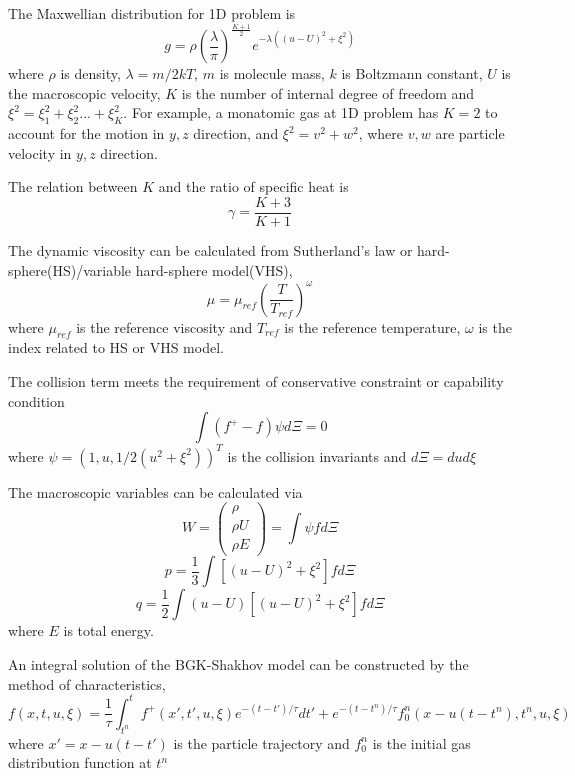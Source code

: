 \documentclass[a4paper]{book}
\begin{document}
The Maxwellian distribution for 1D problem is
\begin{equation}
    g = \rho\left(\frac{\lambda}{\pi}\right)^{\frac{K+1}{2}}e^{-\lambda((u-U)^2+\xi^2)}
\end{equation}
where $\rho$ is density, $\lambda=m/2kT$, $m$ is molecule mass, $k$ is Boltzmann constant, $U$ is the macroscopic velocity, $K$ is the number of internal degree of freedom and $\xi^2=\xi_1^2+\xi_2^2...+\xi_K^2$. For example, a monatomic gas at 1D problem has $K=2$ to account for the motion in $y,z$ direction, and $\xi^2=v^2+w^2$, where $v,w$ are particle velocity in $y,z$ direction. 

The relation between $K$ and the ratio of specific heat is
\begin{equation} 
    \gamma = \frac{K+3}{K+1}
\end{equation}

The dynamic viscosity can be calculated from Sutherland's law or hard-sphere(HS)/variable hard-sphere model(VHS),
\begin{equation} 
    \label{eq:viscosity}
    \mu = \mu_{ref}\left(\frac{T}{T_{ref}}\right)^\omega
\end{equation} 
where $\mu_{ref}$ is the reference viscosity and $T_{ref}$ is the reference temperature, $\omega$ is the index related to HS or VHS model.

The collision term meets the requirement of conservative constraint or capability condition
\begin{equation} 
    \int (f^+-f)\psi d\Xi=0
\end{equation} 
where $\psi=(1,u,1/2(u^2+\xi^2))^T$ is the collision invariants and $d\Xi=dud\xi$

The macroscopic variables can be calculated via
\begin{equation}
W=\begin{pmatrix} \rho\\ \rho U\\ \rho E \end{pmatrix} = \int \psi fd\Xi
\end{equation}
\begin{equation}
    p=\frac{1}{3}\int [(u-U)^2+\xi^2]fd\Xi
\end{equation}
\begin{equation}
    q=\frac{1}{2}\int (u-U)[(u-U)^2+\xi^2]fd\Xi
\end{equation}
where $E$ is total energy.

An integral solution of the BGK-Shakhov model can be constructed by the method of characteristics\cite{Prendergast1993},
\begin{equation}
    \label{eq:csolution}
    f(x,t,u,\xi)=\frac{1}{\tau}\int_{t^n}^t f^+(x',t',u,\xi)e^{-(t-t')/\tau}dt'+e^{-(t-t^n)/\tau}f_0^n(x-u(t-t^n),t^n,u,\xi)
\end{equation}
where $x'=x-u(t-t')$ is the particle trajectory and $f_0^n$ is the initial gas distribution function at $t^n$
\end{document}
